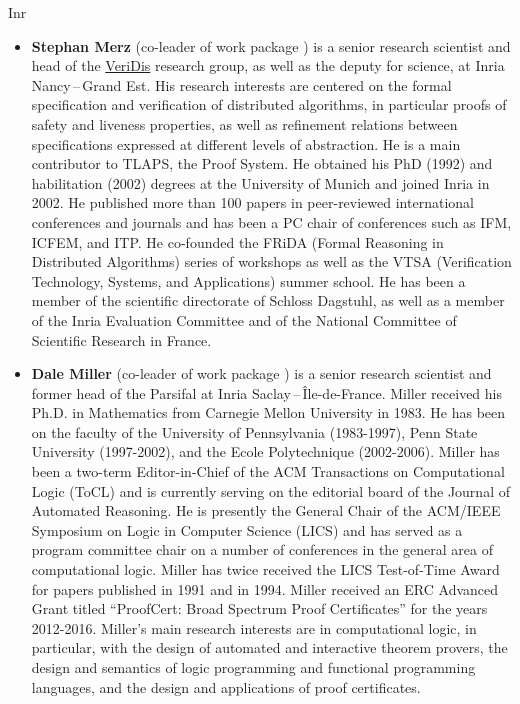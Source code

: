 \begin{sitedescription}{Inr}
\begin{itemize}
\item{\bf Stephan Merz} (co-leader of work package ) is a senior research
scientist and head of the \href{https://team.inria.fr/veridis/}{VeriDis}
research group, as well as the deputy for science, at Inria Nancy\,--\,Grand Est.
His research interests are centered on the formal specification and verification
of distributed algorithms, in particular proofs of safety and liveness
properties, as well as refinement relations between specifications expressed at
different levels of abstraction. He is a main contributor to TLAPS, the \tlaplus
Proof System. He obtained his PhD (1992) and habilitation (2002) degrees at the
University of Munich and joined Inria in 2002. He published more than 100 papers
in peer-reviewed international conferences and journals and has been a PC chair
of conferences such as IFM, ICFEM, and ITP. He co-founded the FRiDA (Formal
Reasoning in Distributed Algorithms) series of workshops as well as the VTSA
(Verification Technology, Systems, and Applications) summer school. He has been
a member of the scientific directorate of Schloss Dagstuhl, as well as a member
of the Inria Evaluation Committee and of the National Committee of Scientific
Research in France.

\item {\bf Dale Miller} (co-leader of work package ) is a senior research scientist
and former head of the Parsifal at Inria Saclay\,--\,\^Ile-de-France.  Miller
received his Ph.D. in Mathematics from Carnegie Mellon University in 1983.  He
has been on the faculty of the University of Pennsylvania (1983-1997), Penn
State University (1997-2002), and the Ecole Polytechnique (2002-2006). Miller
has been a two-term Editor-in-Chief of the ACM Transactions on Computational
Logic (ToCL) and is currently serving on the editorial board of the Journal of
Automated Reasoning. He is presently the General Chair of the ACM/IEEE Symposium
on Logic in Computer Science (LICS) and has served as a program committee chair
on a number of conferences in the general area of computational logic.  Miller
has twice received the LICS Test-of-Time Award for papers published in 1991 and
in 1994.  Miller received an ERC Advanced Grant titled “ProofCert: Broad
Spectrum Proof Certificates” for the years 2012-2016.  Miller's main research
interests are in computational logic, in particular, with the design of
automated and interactive theorem provers, the design and semantics of logic
programming and functional programming languages, and the design and
applications of proof certificates.

\end{itemize}

\end{sitedescription}

